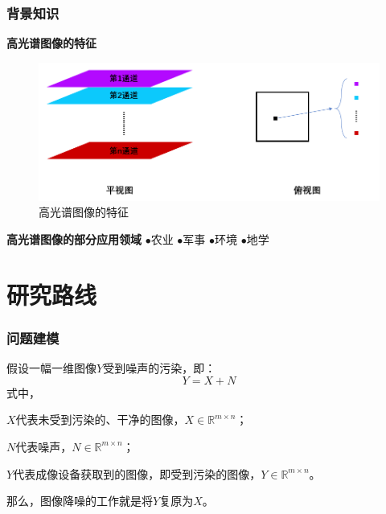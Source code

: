 \documentclass[10pt,aspectratio=43,mathserif]{beamer}
\begin{document}
\begin{frame}
\frametitle{\textbf{背景知识}}
\begin{block}{\textbf{高光谱图像的特征}}
\begin{figure}[H]
\centering
\includegraphics[scale=0.5]{img-characterofphotograph.png}
\caption{高光谱图像的特征}
\end{figure}
\end{block}
    	
\begin{block}{\textbf{高光谱图像的部分应用领域}}
$\bullet$农业 \qquad 
$\bullet$军事 \qquad 
$\bullet$环境 \qquad 
$\bullet$地学
\end{block}
\end{frame}

%

\section[研究路线]{研究路线}
\begin{frame}
\frametitle{\textbf{问题建模}}
\par 假设一幅一维图像$Y$受到噪声的污染，即：
\begin{displaymath}
Y = X + N
\end{displaymath}
式中，
\par$X$代表未受到污染的、干净的图像，$X \in \mathbb{R}^{m \times n}$；
\par$N$代表噪声，$N \in \mathbb{R}^{m \times n}$；
\par$Y$代表成像设备获取到的图像，即受到污染的图像，$Y \in \mathbb{R}^{m \times n}$。
\newline
\par 那么，图像降噪的工作就是将$Y$复原为$X$。
\end{frame}
\end{document}

